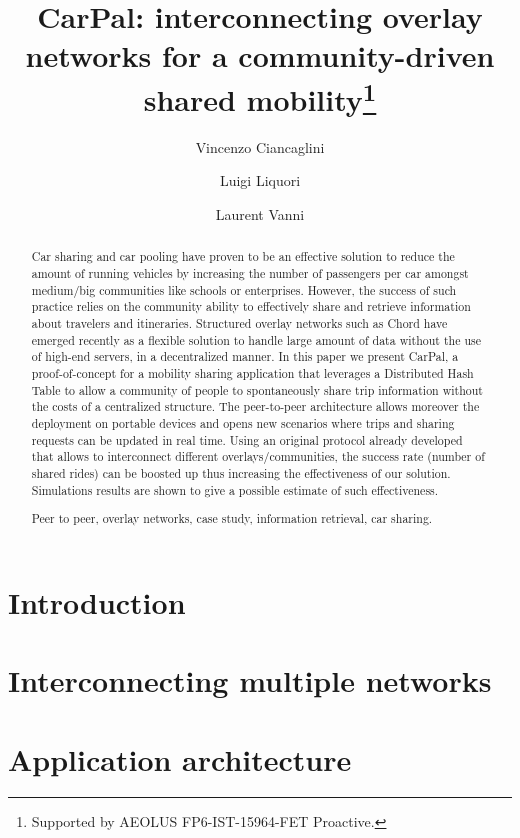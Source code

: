\documentclass{llncs}
\title{CarPal: interconnecting overlay networks for a community-driven
  shared mobility\thanks{Supported by AEOLUS FP6-IST-15964-FET
    Proactive.}}
\author{Vincenzo Ciancaglini \and Luigi Liquori \and Laurent Vanni}
\institute{INRIA Sophia Antipolis M\'editerran\'ee, France\\
  Email: {\tt firstName.lastName@sophia.inria.fr} }
\begin{document}
  
\maketitle
  
\begin{abstract} 
  Car sharing and car pooling have proven to be an effective solution
  to reduce the amount of running vehicles by increasing the number of
  passengers per car amongst medium/big communities like schools or
  enterprises.  However, the success of such practice relies on the
  community ability to effectively share and retrieve
  information about travelers and itineraries.  Structured overlay
  networks such as Chord have emerged recently as a flexible solution
  to handle large amount of data without the use of high-end servers,
  in a decentralized manner.  In this paper we present CarPal, a
  proof-of-concept for a mobility sharing application that leverages a
  Distributed Hash Table to allow a community of people to
  spontaneously share trip information without the costs of a
  centralized structure.  The peer-to-peer architecture allows
  moreover the deployment on portable devices and opens new scenarios
  where trips and sharing requests can be updated in real time.  Using
  an original protocol already developed that allows to
  interconnect different overlays/communities, the success rate
  (number of shared rides) can be boosted up thus increasing the
  effectiveness of our solution. Simulations results are shown to give
  a possible estimate of such effectiveness.
 
   Peer to peer, overlay networks, case
  study, information retrieval, car sharing.
\end{abstract}





\section{Introduction\label{sec:introduction}}



\section{Interconnecting multiple networks\label{sec:link}}



\section{Application architecture \label{sec:architecture}}
\end{document}
